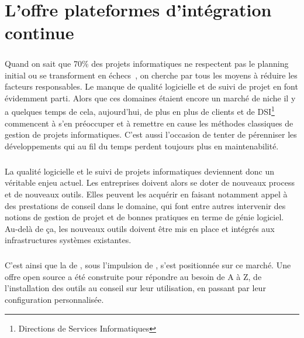 \chapter{L'offre \og plateformes d'intégration continue \fg}
\label{section:pic}

\paragraph{}
Quand on sait que 70\% des projets informatiques ne respectent pas le planning initial ou se transforment en échecs~\cite{echec}, on cherche par tous les moyens à réduire les facteurs responsables.
Le manque de qualité logicielle et de suivi de projet en font évidemment parti.
Alors que ces domaines étaient encore un marché de niche il y a quelques temps de cela, aujourd'hui, de plus en plus de clients et de DSI\footnote{Directions de Services Informatiques} commencent à s'en préoccuper et à remettre en cause les méthodes classiques de gestion de projets informatiques.
C'est aussi l'occasion de tenter de pérenniser les développements qui au fil du temps perdent toujours plus en maintenabilité.

\paragraph{}
La qualité logicielle et le suivi de projets informatiques deviennent donc un véritable enjeu actuel.
Les entreprises doivent alors se doter de nouveaux process et de nouveaux outils. 
Elles peuvent les acquérir en faisant notamment appel à des prestations de conseil dans le domaine, qui font entre autres intervenir des notions de gestion de projet et de bonnes pratiques en terme de génie logiciel.
Au-delà de ça, les nouveaux outils doivent être mis en place et intégrés aux infrastructures systèmes existantes.

\paragraph{}
C'est ainsi que la \abusys{} de \asmile, sous l'impulsion de \agulet, s'est positionnée sur ce marché.
Une offre open source a été construite pour répondre au besoin de A à Z, de l'installation des outils au conseil sur leur utilisation, en passant par leur configuration personnalisée.














